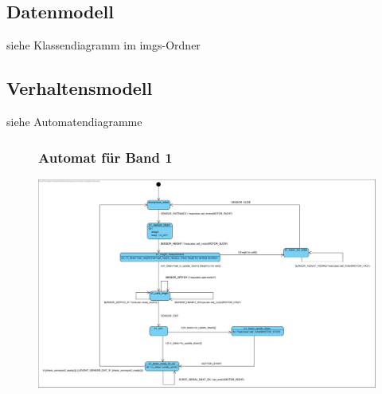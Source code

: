 \documentclass[oneside,a4paper,titlepage]{scrartcl} %
\begin{document}
\subsection{Datenmodell}
siehe Klassendiagramm im imgs-Ordner \newline

\subsection{Verhaltensmodell}
siehe Automatendiagramme

\begin{figure}
	\subsubsection{Automat für Band 1}
	\centering\vfill\includegraphics[angle=90,scale=0.6]{imgs/Band1_FSM.png}
\end{figure}
\end{document}
